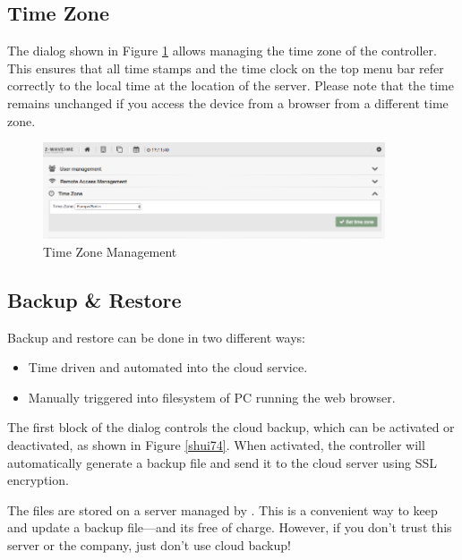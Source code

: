 \subsection{Time Zone}

The dialog shown in Figure \ref{shui73} allows managing the time zone of the controller. 
This ensures that all time stamps and the time clock on the top menu bar refer correctly 
to the local time at the location of the server. Please note that the time remains 
unchanged if you access the device from a browser from a different time zone.

\begin{figure}
\begin{center}
\includegraphics[width=0.9\textwidth]{pngs/cap4/shui73.png}
\caption{Time Zone Management}
\label{shui73}
\end{center}
\end{figure}

\subsection{Backup \& Restore}

Backup and restore can be done in two different ways:

\begin{itemize}
\item Time driven and automated into the \zway cloud service.
\item Manually triggered into filesystem of PC running the web browser.
\end{itemize}

The first block of the  dialog controls the cloud backup, which 
can be activated or deactivated, as shown in Figure \ref{shui74}. When activated, the 
controller will automatically generate a backup file and send it to the cloud server 
using SSL encryption.

The files are stored on a server managed by \zwaveme. This is a convenient way to keep 
and update a backup file---and its free of charge. However, if you don’t trust this 
server or the company, just don’t use cloud backup!


